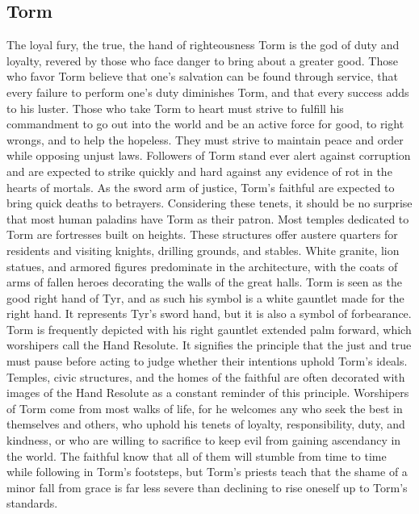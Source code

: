 \documentclass[10pt,a4paper,twoside,twocolumn,openany,bg=print,nodeprecatedcode]{dndbook}
\begin{document}
\subsection{Torm}
The loyal fury, the true, the hand of righteousness
Torm is the god of duty and loyalty, revered by those who face danger to bring about a greater good. Those who favor Torm believe that one's salvation can be found through service, that every failure to perform one's duty diminishes Torm, and that every success adds to his luster. Those who take Torm to heart must strive to fulfill his commandment to go out into the world and be an active force for good, to right wrongs, and to help the hopeless. They must strive to maintain peace and order while opposing unjust laws. Followers of Torm stand ever alert against corruption and are expected to strike quickly and hard against any evidence of rot in the hearts of mortals. As the sword arm of justice, Torm's faithful are expected to bring quick deaths to betrayers. Considering these tenets, it should be no surprise that most human paladins have Torm as their patron.
Most temples dedicated to Torm are fortresses built on heights. These structures offer austere quarters for residents and visiting knights, drilling grounds, and stables. White granite, lion statues, and armored figures predominate in the architecture, with the coats of arms of fallen heroes decorating the walls of the great halls.
Torm is seen as the good right hand of Tyr, and as such his symbol is a white gauntlet made for the right hand. It represents Tyr's sword hand, but it is also a symbol of forbearance. Torm is frequently depicted with his right gauntlet extended palm forward, which worshipers call the Hand Resolute. It signifies the principle that the just and true must pause before acting to judge whether their intentions uphold Torm's ideals. Temples, civic structures, and the homes of the faithful are often decorated with images of the Hand Resolute as a constant reminder of this principle.
Worshipers of Torm come from most walks of life, for he welcomes any who seek the best in themselves and others, who uphold his tenets of loyalty, responsibility, duty, and kindness, or who are willing to sacrifice to keep evil from gaining ascendancy in the world. The faithful know that all of them will stumble from time to time while following in Torm's footsteps, but Torm's priests teach that the shame of a minor fall from grace is far less severe than declining to rise oneself up to Torm's standards.
\end{document}
